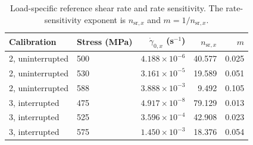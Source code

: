 \documentclass[final,12pt]{cas-sc}
\begin{document}
\begin{table}[pos=htbp]
\centering
\caption{Load-independent material parameters retained from calibrations 2 and 3. The two Hall--Petch rows distinguish the coefficient fitted on the calibration grid from the coefficient transferred to the production grid.}
\label{tab:calibrated_common_parameters}
\end{table}

\begin{table}[pos=htbp]
\centering
\caption{Load-specific reference shear rate and rate sensitivity. The rate-sensitivity exponent is $n_{\mathrm{sr},x}$ and $m=1/n_{\mathrm{sr},x}$.}
\label{tab:calibrated_load_parameters}
\begin{tabular}{llrrr}
\hline
Calibration & Stress (MPa) & $\dot{\gamma}_{0,x}$ (s$^{-1}$) & $n_{\mathrm{sr},x}$ & $m$ \\
\hline
2, uninterrupted & 500 & $4.188\times10^{-6}$ & 40.577 & 0.025 \\
2, uninterrupted & 530 & $3.161\times10^{-5}$ & 19.589 & 0.051 \\
2, uninterrupted & 588 & $3.888\times10^{-3}$ & 9.492 & 0.105 \\
3, interrupted & 475 & $4.917\times10^{-8}$ & 79.129 & 0.013 \\
3, interrupted & 525 & $3.596\times10^{-4}$ & 42.908 & 0.023 \\
3, interrupted & 575 & $1.450\times10^{-3}$ & 18.376 & 0.054 \\
\hline
\end{tabular}
\end{table}
\end{document}
